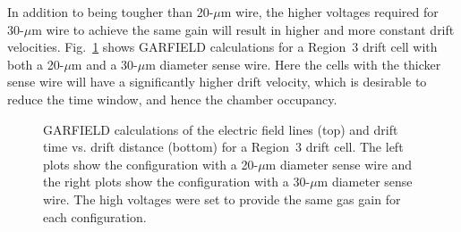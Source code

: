 In addition to being tougher than 20-$\mu$m wire, the higher voltages
required for 30-$\mu$m wire to achieve the same gain will result in
higher and more constant drift velocities.
Fig.~\ref{garfield} shows GARFIELD calculations for a Region~3 drift cell
with both a 20-$\mu$m and a 30-$\mu$m diameter sense wire.  Here the
cells with the thicker sense wire will have a significantly higher drift 
velocity, which is desirable to reduce the time window, and hence the 
chamber occupancy.

\begin{figure}[htbp]
\vspace{10.0cm}
\caption{\small{GARFIELD calculations of the electric field lines (top)
and drift time vs. drift distance (bottom) for a Region~3 drift cell.  The 
left plots show the configuration with a 20-$\mu$m diameter sense wire and 
the right plots show the configuration with a 30-$\mu$m diameter sense wire.
The high voltages were set to provide the same gas gain for each
configuration.}}
\label{garfield}
\end{figure}



 
